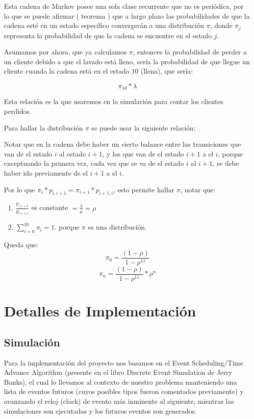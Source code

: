 \documentclass[14pt]{extarticle}
\begin{document}
Esta cadena de Markov posee una sola clase recurrente que no es periódica, por lo que se puede afirmar ( teorema ) que a largo plazo las probabilidades de que la cadena esté en un estado específico convergerán a una distribución $\pi$, donde $\pi_j$ representa la probabilidad de que la cadena se encuentre en el estado $j$. 

Asumamos por ahora, que ya calculamos $\pi$, entonces la probabilidad de perder a un cliente debido a que el lavado está lleno, sería la probabilidad de que llegue un cliente cuando la cadena está en el estado $10$ (llena), que sería:

$$\pi_{10} * \lambda $$

Esta relación es la que usaremos en la simulación para contar los clientes perdidos.

Para hallar la distribución $\pi$ se puede usar la siguiente relación:

Notar que en la cadena debe haber un cierto balance entre las transiciones que van de el estado $i$ al estado $i+1$, y las que van de el estado $i+1$ a el $i$, porque exceptuando la primera vez, cada vez que se va de el estado $i$ al $i+1$, se debe haber ido previamente de el $i+1$ a el $i$.

Por lo que $\pi_i * p_{i, i+1} = \pi_{i+1} * p_{i+1, i}$, esto permite hallar $\pi$, notar que:

\begin{enumerate}
    \item $\frac{p_{i, i+1}}{p_{i+1, i}}$ es constante $= \frac{ \lambda}{ \mu}  = \rho$
    \item $\sum_{i = 0}^{10} \pi_i = 1$. porque $\pi$ es una distribución.
\end{enumerate}

Queda que: 
	$$\pi_0 = \frac{(1 - \rho)}{1 - \rho^{11}}$$
	$$\pi_n = \frac{(1 - \rho)} { 1 - \rho^{11}} * \rho^n$$

\section{Detalles de Implementación}

\subsection{Simulación}

Para la implementación del proyecto nos basamos en el Event Scheduling/Time Advance Algorithm (presente en el libro Discrete Event Simulation de Jerry Banks), el cual lo llevamos al contexto de nuestro problema manteniendo una lista de eventos futuros (cuyos posibles tipos fueron comentados previamente) y avanzando el reloj (clock) de evento más inminente al siguiente, mientras las simulaciones son ejecutadas y los futuros eventos son generados.
\end{document}

